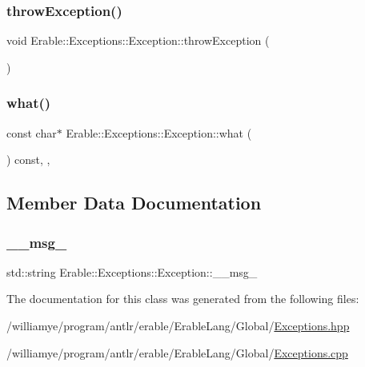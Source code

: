 \subsubsection{\texorpdfstring{throwException()}{throwException()}}
{\footnotesize\ttfamily void Erable\+::\+Exceptions\+::\+Exception\+::throw\+Exception (\begin{DoxyParamCaption}{ }\end{DoxyParamCaption})}

\mbox{\label{class_erable_1_1_exceptions_1_1_exception_a518bc32efd98b49272ade5d2b5aee8cd}} 
\subsubsection{\texorpdfstring{what()}{what()}}
{\footnotesize\ttfamily const char$\ast$ Erable\+::\+Exceptions\+::\+Exception\+::what (\begin{DoxyParamCaption}{ }\end{DoxyParamCaption}) const\hspace{0.3cm}{\ttfamily [inline]}, {\ttfamily [override]}, {\ttfamily [noexcept]}}



\subsection{Member Data Documentation}
\mbox{\label{class_erable_1_1_exceptions_1_1_exception_a660f187522179967a29ff896e61b2165}} 
\subsubsection{\texorpdfstring{\_\_msg\_}{\_\_msg\_}}
{\footnotesize\ttfamily std\+::string Erable\+::\+Exceptions\+::\+Exception\+::\+\_\+\+\_\+msg\+\_\+\hspace{0.3cm}{\ttfamily [private]}}



The documentation for this class was generated from the following files\+:\begin{DoxyCompactItemize}
\item 
/williamye/program/antlr/erable/\+Erable\+Lang/\+Global/\mbox{\hyperlink{_exceptions_8hpp}{Exceptions.\+hpp}}\item 
/williamye/program/antlr/erable/\+Erable\+Lang/\+Global/\mbox{\hyperlink{_exceptions_8cpp}{Exceptions.\+cpp}}\end{DoxyCompactItemize}
